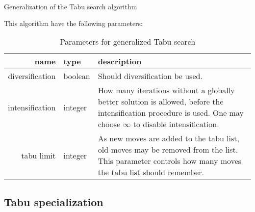 \begin{algorithm}[H]
  \caption{Generalization of the Tabu search algorithm}
  \begin{algorithmic}[1]
     
     
     
    \State
    \Repeat
         
            \State {}
        \Else
                 
            \EndIf
             
        \EndIf
        
        \EndIf
    \State {}
    \EndFunction
  \end{algorithmic}
\end{algorithm}

This algorithm have the following parameters:

\begin{table}[H]
\centering
\begin{tabular}{r|p{2cm}|p{6cm}}
	name & type & description \\ \hline
	diversification & boolean & Should diversification be used. \\
	intensification & integer & How many iterations without a globally better solution is allowed, before the intensification procedure is used. One may choose $\infty$ to disable intensification. \\
	tabu limit & integer & As new moves are added to the tabu list, old moves may be removed from the list. This parameter controls how many moves the tabu list should remember.
\end{tabular}
\caption{Parameters for generalized Tabu search}
\end{table}

\subsection{Tabu specialization}

